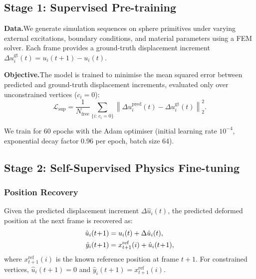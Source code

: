 \documentclass[10pt,twocolumn]{article}
\begin{document}
\subsection{Stage 1: Supervised Pre-training}

\textbf{Data.}\quad We generate simulation sequences on sphere primitives under varying external excitations, boundary conditions, and material parameters using a FEM solver. Each frame provides a ground-truth displacement increment $\Delta u_i^{\mathrm{gt}}(t) = u_i(t+1) - u_i(t)$.

\textbf{Objective.}\quad The model is trained to minimise the mean squared error between predicted and ground-truth displacement increments, evaluated only over unconstrained vertices ($c_i = 0$):
\begin{equation}\label{eq:sup_loss}
    \mathcal{L}_{\mathrm{sup}} = \frac{1}{N_{\mathrm{free}}} \sum_{\{i:\,c_i=0\}} \left\| \Delta u_i^{\mathrm{pred}}(t) - \Delta u_i^{\mathrm{gt}}(t) \right\|_2^2.
\end{equation}

We train for 60 epochs with the Adam optimiser (initial learning rate $10^{-4}$, exponential decay factor 0.96 per epoch, batch size 64).

\subsection{Stage 2: Self-Supervised Physics Fine-tuning}

\subsubsection{Position Recovery}

Given the predicted displacement increment $\Delta \hat{u}_i(t)$, the predicted deformed position at the next frame is recovered as:
\begin{align}\label{eq:pos_recovery}
    \hat{u}_i(t\!+\!1) &= u_i(t) + \Delta\hat{u}_i(t), \notag\\
    \hat{y}_i(t\!+\!1) &= x^{\mathrm{ref}}_{t+1}(i) + \hat{u}_i(t\!+\!1),
\end{align}
where $x^{\mathrm{ref}}_{t+1}(i)$ is the known reference position at frame $t+1$. For constrained vertices, $\hat{u}_i(t+1) = 0$ and $\hat{y}_i(t+1) = x^{\mathrm{ref}}_{t+1}(i)$.
\end{document}
